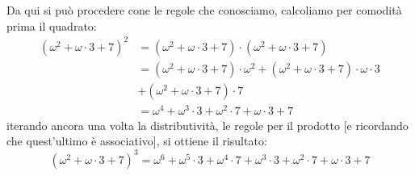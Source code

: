 \begin{example}
\begin{itemize}
		Da qui si pu\`o procedere cone le regole che conosciamo, calcoliamo per comodit\`a prima il quadrato:
		\[ \begin{split}
			(\omega^2 + \omega \cdot 3 + 7)^2 &= (\omega^2 + \omega \cdot 3 + 7) \cdot (\omega^2 + \omega \cdot 3 + 7) \\
											  &= (\omega^2 + \omega \cdot 3 + 7) \cdot \omega^2 + (\omega^2 + \omega \cdot 3 + 7) \cdot \omega \cdot 3 \\
											  &+ (\omega^2 + \omega \cdot 3 + 7) \cdot 7 \\
											  &= \omega^4 + \omega^3 \cdot 3 + \omega^2\cdot 7 + \omega \cdot 3 + 7
		\end{split}
			\]
		iterando ancora una volta la distributivit\`a, le regole per il prodotto [e ricordando che quest'ultimo \`e associativo], si ottiene il risultato:
		\[ (\omega^2 + \omega \cdot 3 + 7)^3 = \omega^6 + \omega^5 \cdot 3 + \omega^4 \cdot 7 + \omega^3 \cdot 3 + \omega^2\cdot 7 + \omega \cdot 3 + 7
			\]
	\end{itemize}
\end{example}